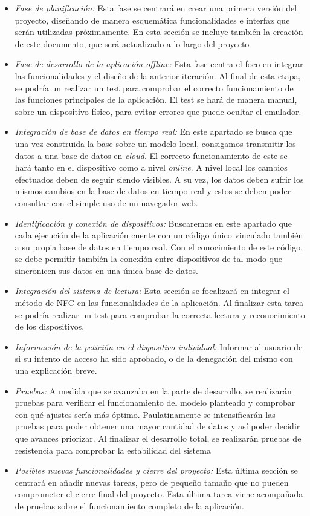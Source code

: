 \documentclass[a4paper,openright,12pt]{article}
\begin{document}
\begin{itemize}
\item{\textit{Fase de planificación:} Esta fase se centrará en crear una primera versión del proyecto, diseñando de manera esquemática funcionalidades e interfaz que serán utilizadas próximamente. En esta sección se incluye también la creación de este documento, que será actualizado a lo largo del proyecto}
\item{\textit{Fase de desarrollo de la aplicación \textit{offline}:} Esta fase centra el foco en integrar las funcionalidades y el diseño de la anterior iteración. Al final de esta etapa, se podría un realizar un test para comprobar el correcto funcionamiento de las funciones principales de la aplicación. El test se hará de manera manual, sobre un dispositivo físico, para evitar errores que puede ocultar el emulador.}
\item{\textit{Integración de base de datos en tiempo real:} En este apartado se busca que una vez construida la base sobre un modelo
local, consigamos transmitir los datos a una base de datos en \textit{cloud}. El correcto funcionamiento de este se hará tanto en el dispositivo como a nivel \textit{online}. A nivel local los cambios efectuados deben de seguir siendo visibles. A su vez, los datos deben sufrir los mismos cambios en la base de datos en tiempo real y estos se deben poder consultar con el simple uso de un navegador web.}
\item{\textit{Identificación y conexión de dispositivos:} Buscaremos en este apartado que cada ejecución de la aplicación cuente con un código único vinculado también a su propia base de datos en tiempo real. Con el conocimiento de este código, se debe permitir también la conexión entre dispositivos de tal modo que sincronicen sus datos en una única base de datos.}
\item{\textit{Integración del sistema de lectura:} Esta sección se focalizará en integrar el método de NFC en las funcionalidades de la aplicación. Al finalizar esta tarea se podría realizar un test para comprobar la correcta lectura y reconocimiento de los dispositivos.}
\item{\textit{Información de la petición en el dispositivo individual:} Informar al usuario de si su intento de acceso ha sido aprobado, o de la denegación del mismo con una explicación breve.}
\item{\textit{Pruebas:} A medida que se avanzaba en la parte de desarrollo, se realizarán pruebas para verificar el funcionamiento del modelo planteado y comprobar con qué ajustes sería más óptimo. Paulatinamente se intensificarán las pruebas para poder obtener una mayor cantidad de datos y así poder decidir que avances priorizar. Al finalizar el desarrollo total, se realizarán pruebas de resistencia para comprobar la estabilidad del sistema}
\item{\textit{Posibles nuevas funcionalidades y cierre del proyecto:} Esta última sección se centrará en añadir nuevas tareas, pero de pequeño tamaño que no pueden comprometer el cierre final del proyecto. Esta última tarea viene acompañada de pruebas sobre el funcionamiento completo de la aplicación.}
\end{itemize}
\end{document}
